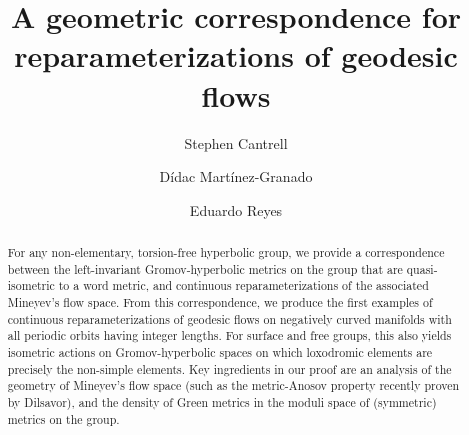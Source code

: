 \documentclass[twoside]{amsart}
\theoremstyle{definition}
\numberwithin{equation}{section}
\numberwithin{theorem}{section}
\begin{document}
\title[A geometric correspondence for reparameterizations]{A geometric correspondence for reparameterizations of geodesic flows}

\author{Stephen Cantrell}
\address{Mathematical Institute, University of St Andrews, North Haugh, St Andrews, KY16 9SS, Scotland}

\author{Dídac Martínez-Granado}
\address{Department of Mathematics, University of Luxembourg, Av. de la Fonte 6, L-4364 Esch-sur-Alzette, Luxembourg}

\author{Eduardo Reyes}
\address{Departamento de Matem\'aticas, Pontificia Universidad Cat\'olica de Chile}


\begin{abstract}
For any non-elementary, torsion-free hyperbolic group, we provide a correspondence between the left-invariant Gromov-hyperbolic metrics on the group that are quasi-isometric to a word metric, and continuous reparameterizations of the associated Mineyev's flow space. From this correspondence, we produce the first examples of continuous reparameterizations of geodesic flows on negatively curved manifolds with all periodic orbits having integer lengths. For surface and free groups, this also yields isometric actions on Gromov-hyperbolic spaces on which loxodromic elements are precisely the non-simple elements. Key ingredients in our proof are an analysis of the geometry of Mineyev's flow space (such as the metric-Anosov property recently proven by Dilsavor), and the density of Green metrics in the moduli space of (symmetric) metrics on the group.
\end{abstract}

\maketitle

\end{document}
